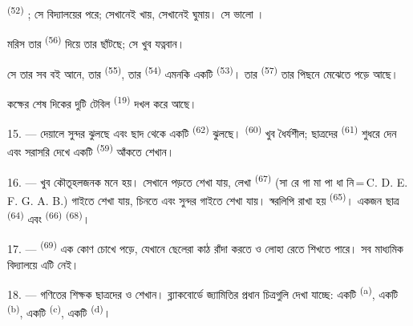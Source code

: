  \textsuperscript{(52)} ; সে বিদ্যালয়ের
 পরে; সেখানেই খায়, সেখানেই ঘুমায়। সে ভালো ।

মরিস তার  \textsuperscript{(56)} দিয়ে তার  ছাঁটছে;
সে খুব যত্নবান।

সে তার সব বই আনে, তার  \textsuperscript{(55)}, তার
 \textsuperscript{(54)} এমনকি একটি 
\textsuperscript{(53)}। তার  \textsuperscript{(57)} তার পিছনে
মেঝেতে পড়ে আছে।

কক্ষের শেষ দিকের দুটি টেবিল  \textsuperscript{(19)}
দখল করে আছে।

\VUsaut{4.6mm}
\VUsaut{3.4mm}

15. ---  দেয়ালে সুন্দর  ঝুলছে এবং ছাদ
থেকে  একটি  \textsuperscript{(62)} ঝুলছে।
 \textsuperscript{(60)} খুব ধৈর্যশীল; ছাত্রদের 
\textsuperscript{(61)} শুধরে দেন এবং সরাসরি দেখে একটি 
\textsuperscript{(59)} আঁকতে শেখান।

16. ---  খুব কৌতূহলজনক মনে হয়। সেখানে
 পড়তে শেখা যায়,  লেখা
 \textsuperscript{(67)} (সা রে গা মা পা ধা নি\,=\,C.
D. E. F. G. A. B.) গাইতে শেখা যায়,  চিনতে এবং সুন্দর
 গাইতে শেখা যায়। স্বরলিপি রাখা হয় 
\textsuperscript{(65)}। একজন ছাত্র  \textsuperscript{(64)}
এবং  \textsuperscript{(66)} 
\textsuperscript{(68)}।

17. ---   \textsuperscript{(69)} এক কোণ
চোখে পড়ে, যেখানে ছেলেরা কাঠ রাঁদা করতে ও লোহা রেতে শিখতে পারে। সব
মাধ্যমিক বিদ্যালয়ে এটি নেই।

\VUsaut{5.0mm}
\VUsaut{3.6mm}

18. --- গণিতের শিক্ষক ছাত্রদের   ও  শেখান। ব্ল্যাকবোর্ডে জ্যামিতির প্রধান
চিত্রগুলি দেখা যাচ্ছে: একটি  \textsuperscript{(a)}, একটি
 \textsuperscript{(b)}, একটি  \textsuperscript{(c)},
একটি  \textsuperscript{(d)}।

